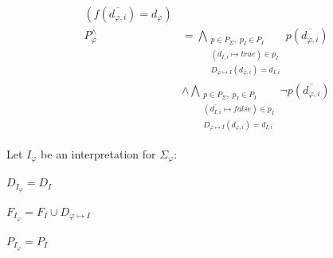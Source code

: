 \documentclass{easychair}
\newenvironment{packed_itemize}{
\vspace*{-0.2em}
\begin{itemize}
\setlength{\partopsep}{0pt}
\setlength{\itemsep}{1pt}
\setlength{\parskip}{0pt}
\setlength{\parsep}{0pt}
}{\end{itemize}}
\newcommand{\true}{{\mathit{true}}}
\newcommand{\false}{{\mathit{false}}}
\begin{document}
\begin{packed_itemize}
\begin{equation*}
\begin{split}
                                 ( f(\overline{d_{\varphi,i}}) = d_{\varphi} ) \\
P^\wedge_{\varphi} &= \bigwedge_{\substack{p \in P_\Sigma,\;p_I \in P_I \\
                                           (\overline{d_{I,i}} \mapsto \true) \in p_I \\
                                           D_{\varphi \mapsto I}(d_{\varphi,i}) = d_{I,i}}}
                                 p(\overline{d_{\varphi,i}}) \\
              &\wedge \bigwedge_{\substack{p \in P_\Sigma,\;p_I \in P_I \\
                                           (\overline{d_{I,i}} \mapsto \false) \in p_I \\
                                           D_{\varphi \mapsto I}(d_{\varphi,i}) = d_{I,i}}}
                                 \neg p(\overline{d_{\varphi,i}})
\end{split}
\end{equation*}
\end{packed_itemize}

\noindent
Let $I_{\varphi}$ be an interpretation for $\Sigma_{\varphi}$:
\begin{packed_itemize}
\item $D_{I_{\varphi}} = D_I$
\item $F_{I_{\varphi}} = F_I \cup D_{\varphi \mapsto I}$
\item $P_{I_{\varphi}} = P_I$
\end{packed_itemize}
\end{document}
